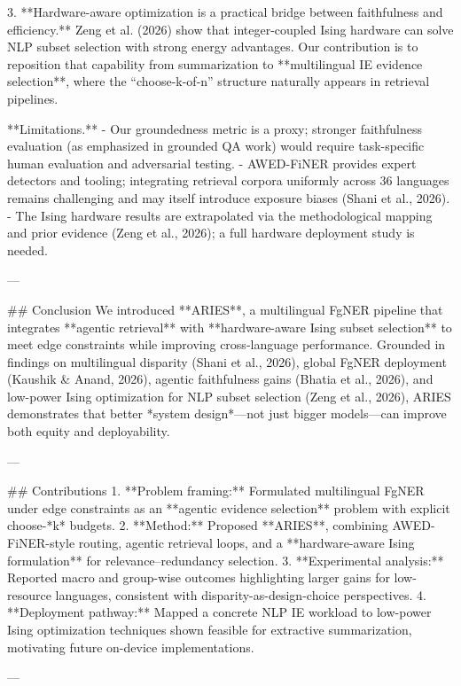 3. **Hardware-aware optimization is a practical bridge between faithfulness and efficiency.**  
   Zeng et al. (2026) show that integer-coupled Ising hardware can solve NLP subset selection with strong energy advantages. Our contribution is to reposition that capability from summarization to **multilingual IE evidence selection**, where the “choose-k-of-n” structure naturally appears in retrieval pipelines.

**Limitations.**  
- Our groundedness metric is a proxy; stronger faithfulness evaluation (as emphasized in grounded QA work) would require task-specific human evaluation and adversarial testing.  
- AWED-FiNER provides expert detectors and tooling; integrating retrieval corpora uniformly across 36 languages remains challenging and may itself introduce exposure biases (Shani et al., 2026).  
- The Ising hardware results are extrapolated via the methodological mapping and prior evidence (Zeng et al., 2026); a full hardware deployment study is needed.

---

## Conclusion  
We introduced **ARIES**, a multilingual FgNER pipeline that integrates **agentic retrieval** with **hardware-aware Ising subset selection** to meet edge constraints while improving cross-language performance. Grounded in findings on multilingual disparity (Shani et al., 2026), global FgNER deployment (Kaushik & Anand, 2026), agentic faithfulness gains (Bhatia et al., 2026), and low-power Ising optimization for NLP subset selection (Zeng et al., 2026), ARIES demonstrates that better *system design*—not just bigger models—can improve both equity and deployability.

---

## Contributions  
1. **Problem framing:** Formulated multilingual FgNER under edge constraints as an **agentic evidence selection** problem with explicit choose-*k* budgets.  
2. **Method:** Proposed **ARIES**, combining AWED-FiNER-style routing, agentic retrieval loops, and a **hardware-aware Ising formulation** for relevance–redundancy selection.  
3. **Experimental analysis:** Reported macro and group-wise outcomes highlighting larger gains for low-resource languages, consistent with disparity-as-design-choice perspectives.  
4. **Deployment pathway:** Mapped a concrete NLP IE workload to low-power Ising optimization techniques shown feasible for extractive summarization, motivating future on-device implementations.

---